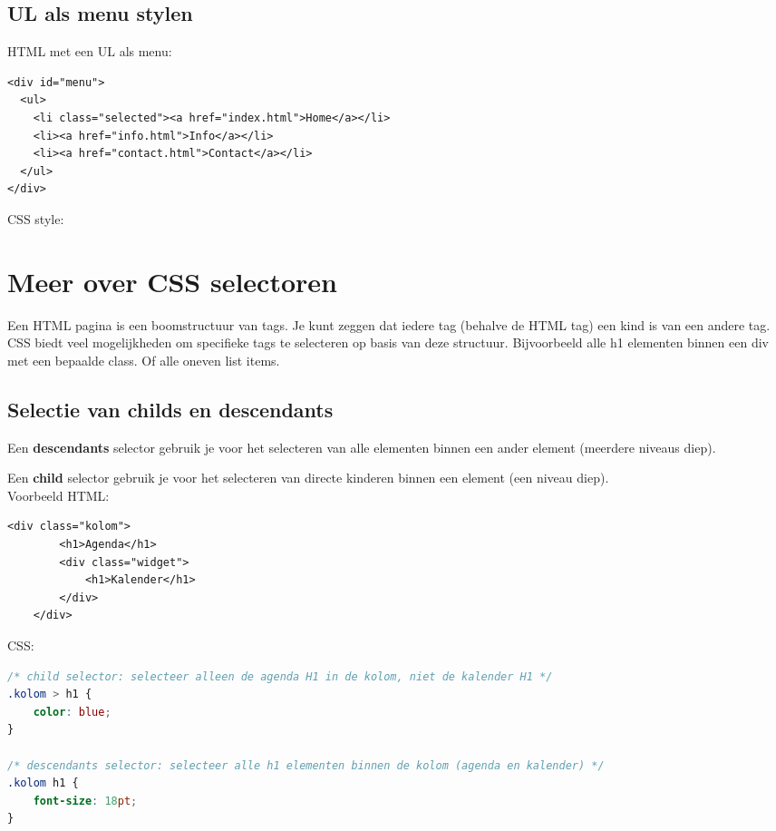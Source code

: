 \documentclass[8pt,pagesize,footinclude=false,headinclude=false]{scrartcl}
\begin{document}
\begin{multicols*}{4}
\subsection*{UL als menu stylen}
HTML met een UL als menu:
\begin{lstlisting}[language=HTML5]
<div id="menu"> 
  <ul>
	<li class="selected"><a href="index.html">Home</a></li>
    <li><a href="info.html">Info</a></li>
    <li><a href="contact.html">Contact</a></li>
  </ul>
</div>
\end{lstlisting}
CSS style:


\clearpage

\section*{Meer over CSS selectoren}
Een HTML pagina is een boomstructuur van tags. Je kunt zeggen dat iedere tag (behalve de HTML tag) een kind is van een andere tag. CSS biedt veel mogelijkheden om specifieke tags te selecteren op basis van deze structuur. Bijvoorbeeld alle h1 elementen binnen een div met een bepaalde class. Of alle oneven list items.

\subsection*{Selectie van childs en descendants}
Een \textbf{descendants} selector gebruik je voor het selecteren van alle elementen binnen een ander element (meerdere niveaus diep).

Een \textbf{child} selector gebruik je voor het selecteren van directe kinderen binnen een element (een niveau diep).\\
\noindent Voorbeeld HTML:
\begin{lstlisting}[language=HTML5]
	<div class="kolom">
		<h1>Agenda</h1>
		<div class="widget">
			<h1>Kalender</h1>
		</div>
	</div>
\end{lstlisting}

\noindent CSS:
\begin{lstlisting}[language=CSS]
/* child selector: selecteer alleen de agenda H1 in de kolom, niet de kalender H1 */
.kolom > h1 {
	color: blue;
}

/* descendants selector: selecteer alle h1 elementen binnen de kolom (agenda en kalender) */
.kolom h1 {
	font-size: 18pt;
}
\end{lstlisting}


\end{multicols*}
\end{document}
